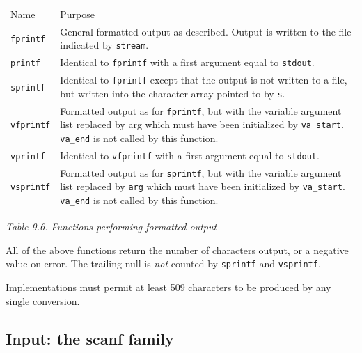    \begin{tabular}{lp{\textwidth}}
     Name & Purpose
    \\

     \texttt{fprintf} & General formatted output  as  described.
      Output  is written to the file indicated
      by \texttt{stream}.
    \\

     \texttt{printf} & Identical  to  \texttt{fprintf}  with   a   first
      argument equal to \texttt{stdout}.
    \\

     \texttt{sprintf} & Identical to  \texttt{fprintf}  except  that  the
      output  is  not  written  to a file, but
      written into the character array pointed
      to by \texttt{s}.
    \\

     \texttt{vfprintf} & Formatted output  as  for  \texttt{fprintf},  but
      with the variable argument list replaced
      by arg which must have been  initialized
      by  \texttt{va\_start}. \texttt{va\_end}  is not called by
      this function.
    \\

     \texttt{vprintf} & Identical  to  \texttt{vfprintf}  with  a   first
      argument equal to \texttt{stdout}.
    \\

     \texttt{vsprintf} & Formatted output  as  for  \texttt{sprintf},  but
      with the variable argument list replaced
      by \texttt{arg} which must have been  initialized
      by  \texttt{va\_start}.   \texttt{va\_end}  is not called by
      this function.
    \\
\end{tabular}

\begin{center}\textit{Table 9.6. Functions performing formatted output}\end{center}


   All of the above functions return the number  of  characters
    output,  or a negative value on error.  The trailing null is
    \textit{not} counted by \texttt{sprintf} and \texttt{vsprintf}.


   Implementations must permit at least 509 characters  to  be
    produced by any single conversion.


  

  \subsection{Input: the scanf family}
   

